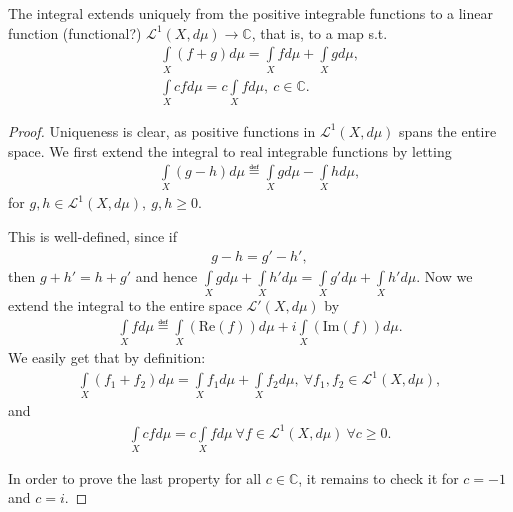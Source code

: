 \begin{prop}
    The integral extends uniquely from the positive integrable functions to a linear function (functional?) \(\mathcal{L}^{1}(X, d\mu) \rightarrow \mathbb{C}\),
    that is, to a map s.t.
    \begin{align*}
        \int\limits_{X}(f + g)d\mu = \int\limits_{X}fd\mu + \int\limits_{X}gd\mu, \\
        \int\limits_{X}cfd\mu = c \int\limits_{X}fd\mu, \ c\in\mathbb{C}.
    \end{align*}
\end{prop}
\begin{proof}
    Uniqueness is clear, as positive functions in \(\mathcal{L}^{1}(X, d\mu)\) spans the entire space. We first extend the integral to real
    integrable functions by letting
    \begin{align*}
        \int\limits_{X}(g-h)d\mu \eqdef \int\limits_{X}gd\mu - \int\limits_{X}hd\mu, 
    \end{align*}
    for \(g,h\in \mathcal{L}^{1}(X,d\mu), \ g,h\geq0\).

    This is well-defined, since if
    \begin{align*}
        g - h = g' - h',
    \end{align*}
    then \(g+h' = h + g'\) and hence \(\int\limits_{X}gd\mu + \int\limits_{X}h'd\mu = \int\limits_{X}g'd\mu + \int\limits_{X}h'd\mu\).
    Now we extend the integral to the entire space \(\mathcal{L}'(X,d\mu)\) by
    \begin{align*}
        \int\limits_{X}fd\mu \eqdef \int\limits_{X} (\text{Re}(f))d\mu + i \int\limits_{X}(\text{Im}(f))d\mu.
    \end{align*}
    We easily get that by definition:
    \begin{align*}
        \int\limits_{X}(f_1+f_2)d\mu = \int\limits_{X}f_1d\mu + \int\limits_{X}f_2d\mu, \ \forall f_1, f_2 \in \mathcal{L}^{1}(X, d\mu),
    \end{align*}
    and
    \begin{align*}
        \int\limits_{X}cfd\mu = c\int\limits_{X}fd\mu \ \forall f\in \mathcal{L}^{1}(X,d\mu) \ \forall c\geq 0.
    \end{align*}

    In order to prove the last property for all \(c\in\mathbb{C}\), it remains to check it for \(c=-1\) and \(c=i\).


\end{proof}
